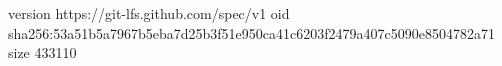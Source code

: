 version https://git-lfs.github.com/spec/v1
oid sha256:53a51b5a7967b5eba7d25b3f51e950ca41c6203f2479a407c5090e8504782a71
size 433110
